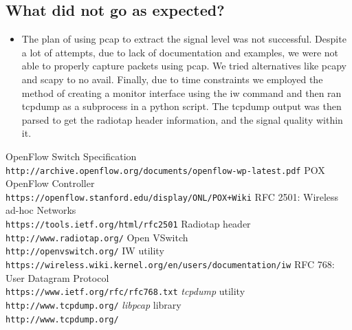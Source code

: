 \documentclass{article}
\begin{document}
\subsection{What did not go as expected?}
\begin{itemize}
\item The plan of using pcap to extract the signal  level was not successful. Despite a lot of attempts, due to lack of
documentation and examples, we were not able to properly capture packets using pcap. We tried alternatives like pcapy
and scapy to no avail. Finally, due to time constraints we employed the method of creating a monitor interface using the
iw command and then ran tcpdump as a subprocess in a python script. The tcpdump output was then parsed to get the
radiotap header information, and the signal quality within it. 
\end{itemize}
\begin{thebibliography}{5}
OpenFlow Switch Specification
\\\texttt{http://archive.openflow.org/documents/openflow-wp-latest.pdf}
POX OpenFlow Controller
\\\texttt{https://openflow.stanford.edu/display/ONL/POX+Wiki}
RFC 2501: Wireless ad-hoc Networks
\\\texttt{https://tools.ietf.org/html/rfc2501}
Radiotap header
\\\texttt{http://www.radiotap.org/}
\bibitem{}
Open VSwitch
\\\texttt{http://openvswitch.org/}
\bibitem{}
IW utility
\\\texttt{https://wireless.wiki.kernel.org/en/users/documentation/iw}
\bibitem{}
RFC 768: User Datagram Protocol
\\\texttt{https://www.ietf.org/rfc/rfc768.txt}
\bibitem{}
\textit{tcpdump} utility
\\\texttt{http://www.tcpdump.org/}
\bibitem{}
\textit{libpcap} library
\\\texttt{http://www.tcpdump.org/}
\end{thebibliography}
\end{document}
